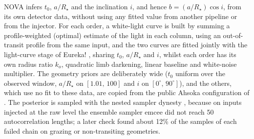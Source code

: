 NOVA infers $t_0$, $a/R_\star$ and the inclination $i$, and hence
$b=(a/R_\star)\cos i$, from its own detector data, without using any fitted
value from another pipeline or from the injector. For each order, a
white-light curve is built by summing a profile-weighted (optimal) estimate of
the light in each column, using an out-of-transit profile from the same
input, and the two curves are fitted jointly with the light-curve stage of
Eureka! \citep{BellEtAl2022}, sharing $t_0$, $a/R_\star$ and $i$, whilst each
order has its own radius ratio $k_o$, quadratic limb darkening, linear
baseline and white-noise multiplier. The geometry priors are deliberately
wide ($t_0$ uniform over the observed window, $a/R_\star$ on $[1.01,\,100]$
and $i$ on $[0^\circ,\,90^\circ]$), and the others, which use no fit to these
data, are copied from the public Ahsoka configuration of
\citet{LouieEtAl2025}. The posterior is sampled with
the nested sampler dynesty \citep{Speagle2020}, because on inputs injected at
the raw level the ensemble sampler emcee \citep{ForemanMackeyEtAl2013} did not
reach 50 autocorrelation lengths; a later check found about 12\% of the
samples of each failed chain on grazing or non-transiting geometries.

